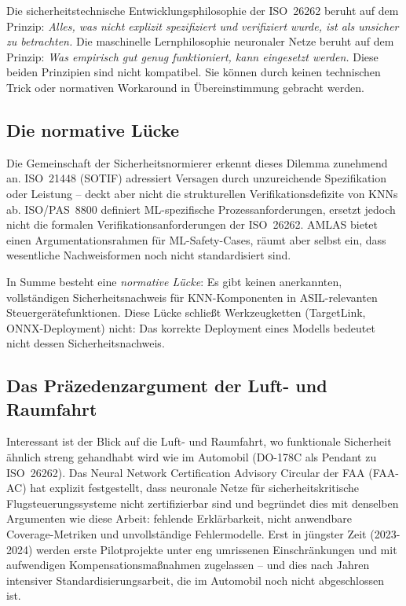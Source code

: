 ﻿\documentclass[12pt,a4paper]{article}
\begin{document}
Die sicherheitstechnische Entwicklungsphilosophie der ISO~26262 beruht auf dem
Prinzip: \emph{Alles, was nicht explizit spezifiziert und verifiziert wurde,
ist als unsicher zu betrachten.} Die maschinelle Lernphilosophie neuronaler Netze beruht auf dem Prinzip: \emph{Was empirisch gut genug funktioniert, kann eingesetzt werden.} Diese beiden Prinzipien sind nicht kompatibel. Sie k\"onnen durch keinen technischen Trick oder normativen Workaround in \"Ubereinstimmung gebracht werden.

\subsection{Die normative L\"ucke}
\label{subsec:normative_luecke}

Die Gemeinschaft der Sicherheitsnormierer erkennt dieses Dilemma zunehmend an.
ISO~21448 (SOTIF) \cite{iso21448} adressiert Versagen durch unzureichende
Spezifikation oder Leistung -- deckt aber nicht die strukturellen
Verifikationsdefizite von KNNs ab. ISO/PAS~8800 \cite{isopas8800} definiert
ML-spezifische Prozessanforderungen, ersetzt jedoch nicht die formalen
Verifikationsanforderungen der ISO~26262. AMLAS \cite{AMLAS2021} bietet
einen Argumentationsrahmen f\"ur ML-Safety-Cases, r\"aumt aber selbst ein,
dass wesentliche Nachweisformen noch nicht standardisiert sind.

In Summe besteht eine \emph{normative L\"ucke}: Es gibt keinen anerkannten, vollst\"andigen
Sicherheitsnachweis f\"ur KNN-Komponenten in ASIL-relevanten Steuerger\"atefunktionen.
Diese L\"ucke schlie\ss{}t Werkzeugketten (TargetLink, ONNX-Deployment) nicht:
Das korrekte Deployment eines Modells bedeutet nicht dessen Sicherheitsnachweis.

\subsection{Das Pr\"azedenzargument der Luft- und Raumfahrt}
\label{subsec:praezedenz}

Interessant ist der Blick auf die Luft- und Raumfahrt, wo funktionale Sicherheit
\"ahnlich streng gehandhabt wird wie im Automobil (DO-178C als Pendant zu ISO~26262).
Das Neural Network Certification Advisory Circular der FAA (FAA-AC) hat explizit
festgestellt, dass neuronale Netze f\"ur sicherheitskritische Flugsteuerungssysteme
nicht zertifizierbar sind und begr\"undet dies mit denselben Argumenten wie diese
Arbeit: fehlende Erkl\"arbarkeit, nicht anwendbare Coverage-Metriken und
unvollst\"andige Fehlermodelle. Erst in j\"ungster Zeit (2023-2024) werden erste
Pilotprojekte unter eng umrissenen Einschr\"ankungen und mit aufwendigen
Kompensationsma\ss{}nahmen zugelassen -- und dies nach Jahren intensiver
Standardisierungsarbeit, die im Automobil noch nicht abgeschlossen ist.
\end{document}

